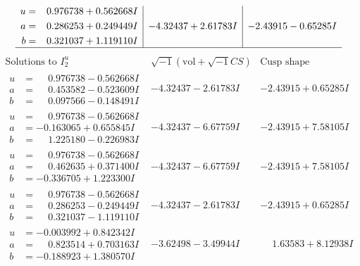 \documentclass[1p]{elsarticle_modified}
\theoremstyle{definition}
\newcommand{\I}{\sqrt{-1}}
\begin{document}
$$\begin{array}{c|c|c}
\begin{aligned}
u &= \phantom{-}0.976738 + 0.562668 I \\
a &= \phantom{-}0.286253 + 0.249449 I \\
b &= \phantom{-}0.321037 + 1.119110 I\end{aligned}
 & -4.32437 + 2.61783 I & -2.43915 - 0.65285 I\\
 \hline 
 \end{array}$$\newpage$$\begin{array}{c|c|c}  
\text{Solutions to }I^u_{2}& \I (\text{vol} + \sqrt{-1}CS) & \text{Cusp shape}\\
 \hline 
\begin{aligned}
u &= \phantom{-}0.976738 - 0.562668 I \\
a &= \phantom{-}0.453582 - 0.523609 I \\
b &= \phantom{-}0.097566 - 0.148491 I\end{aligned}
 & -4.32437 - 2.61783 I & -2.43915 + 0.65285 I \\ \hline\begin{aligned}
u &= \phantom{-}0.976738 - 0.562668 I \\
a &= -0.163065 + 0.655845 I \\
b &= \phantom{-}1.225180 - 0.226983 I\end{aligned}
 & -4.32437 - 6.67759 I & -2.43915 + 7.58105 I \\ \hline\begin{aligned}
u &= \phantom{-}0.976738 - 0.562668 I \\
a &= \phantom{-}0.462635 + 0.371400 I \\
b &= -0.336705 + 1.223300 I\end{aligned}
 & -4.32437 - 6.67759 I & -2.43915 + 7.58105 I \\ \hline\begin{aligned}
u &= \phantom{-}0.976738 - 0.562668 I \\
a &= \phantom{-}0.286253 - 0.249449 I \\
b &= \phantom{-}0.321037 - 1.119110 I\end{aligned}
 & -4.32437 - 2.61783 I & -2.43915 + 0.65285 I \\ \hline\begin{aligned}
u &= -0.003992 + 0.842342 I \\
a &= \phantom{-}0.823514 + 0.703163 I \\
b &= -0.188923 + 1.380570 I\end{aligned}
 & -3.62498 - 3.49944 I & \phantom{-}1.63583 + 8.12938 I \\ \hline\begin{aligned}

\end{aligned}
\end{array}$$
\end{document}
